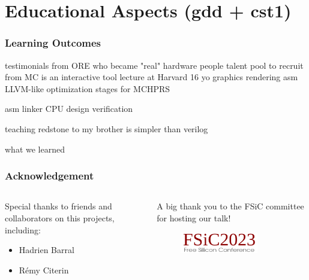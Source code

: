 \documentclass[aspectratio=169]{beamer}
\begin{document}
\section{Educational Aspects (gdd + cst1)}

\begin{frame}
	\frametitle{Learning Outcomes}
	testimonials from ORE who became "real" hardware people
	talent pool to recruit from
	MC is an interactive tool
	lecture at Harvard
	16 yo
	graphics rendering
	asm
	LLVM-like optimization stages for MCHPRS

	asm
	linker
	CPU design
	verification

	teaching redstone to my brother is simpler than verilog

	what we learned
\end{frame}

\begin{frame}
	\frametitle{Acknowledgement}
	\begin{columns}
		\begin{column}{0.5\textwidth}
			Special thanks to friends and collaborators on this projects,
			including:
			\begin{itemize}
				\item Hadrien Barral
				\item Rémy Citerin
			\end{itemize}
		\end{column}
		\begin{column}{0.5\textwidth}
			A big thank you to the FSiC committee for hosting our talk!
			\begin{figure}
				\includegraphics[width=0.75\textwidth]{imgs/Fsic2023_logo.png}
			\end{figure}
		\end{column}
	\end{columns}
\end{frame}
\end{document}
